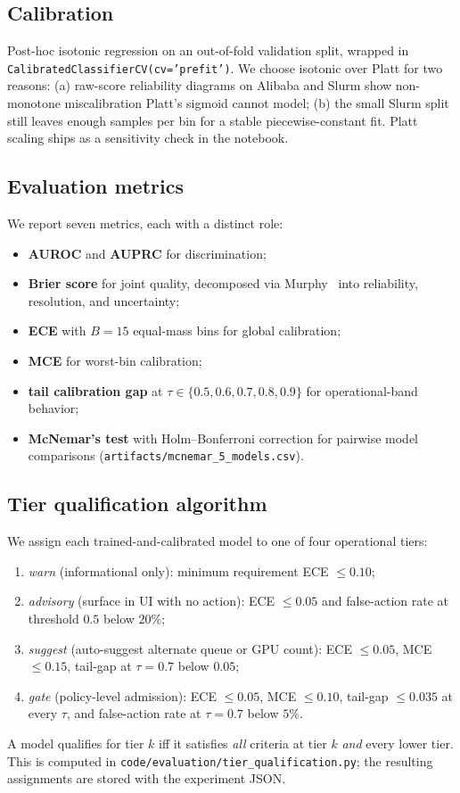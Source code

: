 \documentclass[conference]{IEEEtran}
\begin{document}
\subsection{Calibration}
Post-hoc isotonic regression on an out-of-fold validation split, wrapped in \texttt{CalibratedClassifierCV(cv='prefit')}. We choose isotonic over Platt for two reasons: (a) raw-score reliability diagrams on Alibaba and Slurm show non-monotone miscalibration Platt's sigmoid cannot model; (b) the small Slurm split still leaves enough samples per bin for a stable piecewise-constant fit. Platt scaling ships as a sensitivity check in the notebook.

\subsection{Evaluation metrics}
We report seven metrics, each with a distinct role:
\begin{itemize}
    \item \textbf{AUROC} and \textbf{AUPRC} for discrimination;
    \item \textbf{Brier score} for joint quality, decomposed via Murphy~\cite{murphy1973} into reliability, resolution, and uncertainty;
    \item \textbf{ECE} with $B=15$ equal-mass bins for global calibration;
    \item \textbf{MCE} for worst-bin calibration;
    \item \textbf{tail calibration gap} at $\tau \in \{0.5,0.6,0.7,0.8,0.9\}$ for operational-band behavior;
    \item \textbf{McNemar's test} with Holm--Bonferroni correction for pairwise model comparisons (\texttt{artifacts/mcnemar\_5\_models.csv}).
\end{itemize}

\subsection{Tier qualification algorithm}
\label{sec:tiers}
We assign each trained-and-calibrated model to one of four operational tiers:
\begin{enumerate}
    \item \textit{warn} (informational only): minimum requirement ECE $\leq 0.10$;
    \item \textit{advisory} (surface in UI with no action): ECE $\leq 0.05$ and false-action rate at threshold $0.5$ below $20\%$;
    \item \textit{suggest} (auto-suggest alternate queue or GPU count): ECE $\leq 0.05$, MCE $\leq 0.15$, tail-gap at $\tau = 0.7$ below $0.05$;
    \item \textit{gate} (policy-level admission): ECE $\leq 0.05$, MCE $\leq 0.10$, tail-gap $\leq 0.035$ at every $\tau$, and false-action rate at $\tau = 0.7$ below $5\%$.
\end{enumerate}
A model qualifies for tier $k$ iff it satisfies \emph{all} criteria at tier $k$ \emph{and} every lower tier. This is computed in \texttt{code/evaluation/tier\_qualification.py}; the resulting assignments are stored with the experiment JSON.
\end{document}
